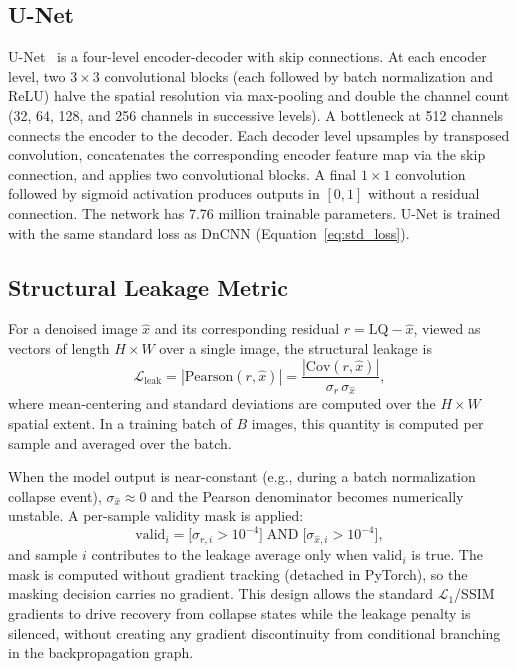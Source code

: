 \documentclass[review,12pt]{elsarticle}
\begin{document}
\subsection{U-Net}
\label{sec:methods:unet}

U-Net~\cite{Ronneberger2015} is a four-level encoder-decoder with skip
connections.  At each encoder level, two $3 \times 3$ convolutional
blocks (each followed by batch normalization and ReLU) halve the spatial
resolution via max-pooling and double the channel count (32, 64, 128,
and 256 channels in successive levels).  A bottleneck at 512 channels
connects the encoder to the decoder.  Each decoder level upsamples by
transposed convolution, concatenates the corresponding encoder feature
map via the skip connection, and applies two convolutional blocks.  A
final $1 \times 1$ convolution followed by sigmoid activation produces
outputs in $[0, 1]$ without a residual connection.  The network has
7.76 million trainable parameters.  U-Net is trained with the same
standard loss as DnCNN (Equation~\ref{eq:std_loss}).

\subsection{Structural Leakage Metric}
\label{sec:methods:leakage_metric}

For a denoised image $\hat{x}$ and its corresponding residual
$r = \mathrm{LQ} - \hat{x}$, viewed as vectors of length $H \times W$
over a single image, the structural leakage is
\begin{equation}
  \mathcal{L}_{\mathrm{leak}} =
  |\mathrm{Pearson}(r, \hat{x})| =
  \frac{|\mathrm{Cov}(r, \hat{x})|}{\sigma_{r}\,\sigma_{\hat{x}}},
  \label{eq:leakage}
\end{equation}
where mean-centering and standard deviations are computed over the
$H \times W$ spatial extent.  In a training batch of $B$ images, this
quantity is computed per sample and averaged over the batch.

When the model output is near-constant (e.g., during a batch
normalization collapse event), $\sigma_{\hat{x}} \approx 0$ and the
Pearson denominator becomes numerically unstable.  A per-sample validity
mask is applied:
\begin{equation}
  \mathrm{valid}_{i} =
  \bigl[\sigma_{r,i} > 10^{-4}\bigr]
  \;\mathrm{AND}\;
  \bigl[\sigma_{\hat{x},i} > 10^{-4}\bigr],
  \label{eq:mask}
\end{equation}
and sample $i$ contributes to the leakage average only when
$\mathrm{valid}_{i}$ is true.  The mask is computed without gradient
tracking (detached in PyTorch), so the masking decision carries no
gradient.  This design allows the standard $\mathcal{L}_{1}$/SSIM
gradients to drive recovery from collapse states while the leakage
penalty is silenced, without creating any gradient discontinuity from
conditional branching in the backpropagation graph.
\end{document}
